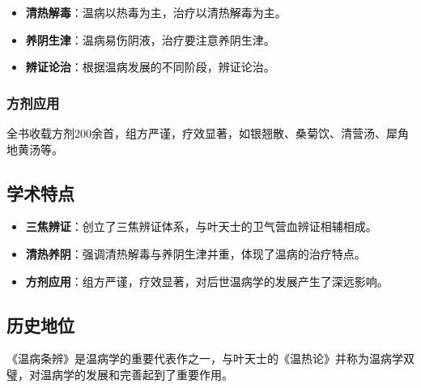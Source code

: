 \documentclass[12pt,UTF8]{ctexbook}
\begin{document}
\begin{itemize}
\item \textbf{清热解毒}：温病以热毒为主，治疗以清热解毒为主。
\item \textbf{养阴生津}：温病易伤阴液，治疗要注意养阴生津。
\item \textbf{辨证论治}：根据温病发展的不同阶段，辨证论治。
\end{itemize}

\subsubsection{方剂应用}

全书收载方剂200余首，组方严谨，疗效显著，如银翘散、桑菊饮、清营汤、犀角地黄汤等。

\subsection{学术特点}

\begin{itemize}
\item \textbf{三焦辨证}：创立了三焦辨证体系，与叶天士的卫气营血辨证相辅相成。
\item \textbf{清热养阴}：强调清热解毒与养阴生津并重，体现了温病的治疗特点。
\item \textbf{方剂应用}：组方严谨，疗效显著，对后世温病学的发展产生了深远影响。
\end{itemize}

\subsection{历史地位}

《温病条辨》是温病学的重要代表作之一，与叶天士的《温热论》并称为温病学双璧，对温病学的发展和完善起到了重要作用。

\backmatter
\end{document}
